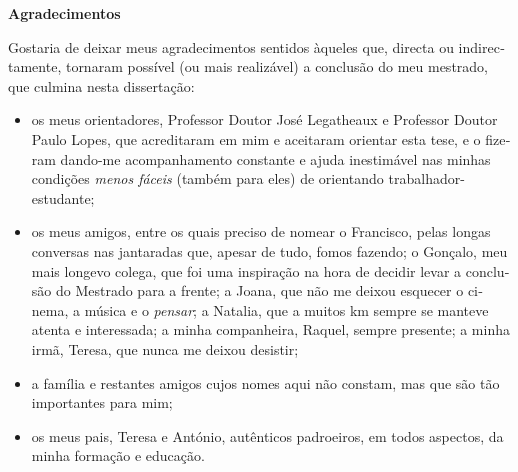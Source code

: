 
\cleardoublepage\thispagestyle{plain}

\begin{otherlanguage}{portuguese}
  \textbf{\Large Agradecimentos}

  Gostaria de deixar meus agradecimentos sentidos àqueles que, directa ou indirectamente, tornaram possível (ou mais realizável) a conclusão do meu mestrado, que culmina nesta dissertação:
  \begin{itemize}
    \item os meus orientadores, Professor Doutor José Legatheaux e Professor Doutor Paulo Lopes, que acreditaram em mim e aceitaram orientar esta tese, e o fizeram dando-me acompanhamento constante e ajuda inestimável nas minhas condições \emph{menos fáceis} (também para eles) de orientando trabalhador-estudante;
    \item os meus amigos, entre os quais preciso de nomear o Francisco, pelas longas conversas nas jantaradas que, apesar de tudo, fomos fazendo; o Gonçalo, meu mais longevo colega, que foi uma inspiração na hora de decidir levar a conclusão do Mestrado para a frente; a Joana, que não me deixou esquecer o cinema, a música e o \emph{pensar}; a Natalia, que a muitos km sempre se manteve atenta e interessada; a minha companheira, Raquel, sempre presente; a minha irmã, Teresa, que nunca me deixou desistir;
    \item a família e restantes amigos cujos nomes aqui não constam, mas que são tão importantes para mim;
    \item os meus pais, Teresa e António, autênticos padroeiros, em todos aspectos, da minha formação e educação.
  \end{itemize}
\end{otherlanguage}
